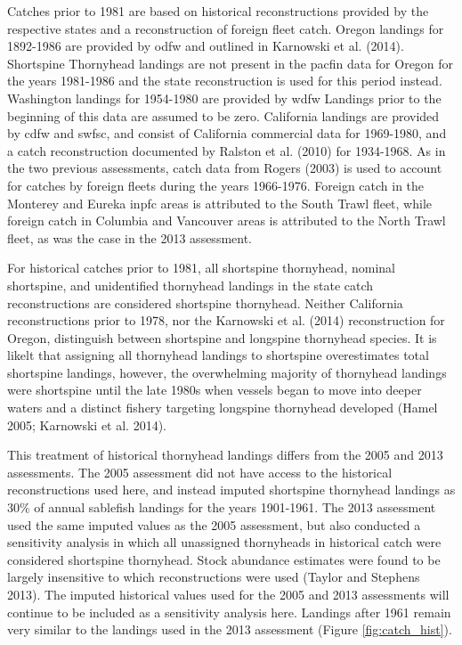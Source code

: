 \documentclass[11pt,
  english,
  letterpaper,
]{article}
\begin{document}
Catches prior to 1981 are based on historical reconstructions provided by the respective states and a reconstruction of foreign fleet catch. Oregon landings for 1892-1986 are provided by \gls{odfw} and outlined in Karnowski et al. (2014). Shortspine Thornyhead landings are not present in the \gls{pacfin} data for Oregon for the years 1981-1986 and the state reconstruction is used for this period instead. Washington landings for 1954-1980 are provided by \gls{wdfw} Landings prior to the beginning of this data are assumed to be zero. California landings are provided by \gls{cdfw} and \gls{swfsc}, and consist of California commercial data for 1969-1980, and a catch reconstruction documented by Ralston et al. (2010) for 1934-1968. As in the two previous assessments, catch data from Rogers (2003) is used to account for catches by foreign fleets during the years 1966-1976. Foreign catch in the Monterey and Eureka \gls{inpfc} areas is attributed to the South Trawl fleet, while foreign catch in Columbia and Vancouver areas is attributed to the North Trawl fleet, as was the case in the 2013 assessment.

For historical catches prior to 1981, all shortspine thornyhead, nominal shortspine, and unidentified thornyhead landings in the state catch reconstructions are considered shortspine thornyhead. Neither California reconstructions prior to 1978, nor the Karnowski et al. (2014) reconstruction for Oregon, distinguish between shortspine and longspine thornyhead species. It is likelt that assigning all thornyhead landings to shortspine overestimates total shortspine landings, however, the overwhelming majority of thornyhead landings were shortspine until the late 1980s when vessels began to move into deeper waters and a distinct fishery targeting longspine thornyhead developed (Hamel 2005; Karnowski et al. 2014).

This treatment of historical thornyhead landings differs from the 2005 and 2013 assessments. The 2005 assessment did not have access to the historical reconstructions used here, and instead imputed shortspine thornyhead landings as 30\% of annual sablefish landings for the years 1901-1961. The 2013 assessment used the same imputed values as the 2005 assessment, but also conducted a sensitivity analysis in which all unassigned thornyheads in historical catch were considered shortspine thornyhead. Stock abundance estimates were found to be largely insensitive to which reconstructions were used (Taylor and Stephens 2013). The imputed historical values used for the 2005 and 2013 assessments will continue to be included as a sensitivity analysis here. Landings after 1961 remain very similar to the landings used in the 2013 assessment (Figure \ref{fig:catch_hist}).
\end{document}
